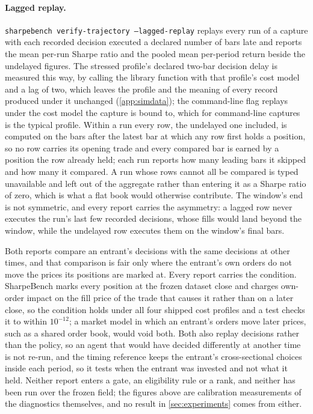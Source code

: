 \paragraph{Lagged replay.} \texttt{sharpebench verify-trajectory --lagged-replay} replays every run of a capture with each recorded decision executed a declared number of bars late and reports the mean per-run Sharpe ratio and the pooled mean per-period return beside the undelayed figures. The stressed profile's declared two-bar decision delay is measured this way, by calling the library function with that profile's cost model and a lag of two, which leaves the profile and the meaning of every record produced under it unchanged (\cref{app:simdata}); the command-line flag replays under the cost model the capture is bound to, which for command-line captures is the typical profile. Within a run every row, the undelayed one included, is computed on the bars after the latest bar at which any row first holds a position, so no row carries its opening trade and every compared bar is earned by a position the row already held; each run reports how many leading bars it skipped and how many it compared. A run whose rows cannot all be compared is typed unavailable and left out of the aggregate rather than entering it as a Sharpe ratio of zero, which is what a flat book would otherwise contribute. The window's end is not symmetric, and every report carries the asymmetry: a lagged row never executes the run's last few recorded decisions, whose fills would land beyond the window, while the undelayed row executes them on the window's final bars.

Both reports compare an entrant's decisions with the same decisions at other times, and that comparison is fair only where the entrant's own orders do not move the prices its positions are marked at. Every report carries the condition. SharpeBench marks every position at the frozen dataset close and charges own-order impact on the fill price of the trade that causes it rather than on a later close, so the condition holds under all four shipped cost profiles and a test checks it to within $10^{-12}$; a market model in which an entrant's orders move later prices, such as a shared order book, would void both. Both also replay decisions rather than the policy, so an agent that would have decided differently at another time is not re-run, and the timing reference keeps the entrant's cross-sectional choices inside each period, so it tests when the entrant was invested and not what it held. Neither report enters a gate, an eligibility rule or a rank, and neither has been run over the frozen field; the figures above are calibration measurements of the diagnostics themselves, and no result in \cref{sec:experiments} comes from either.

